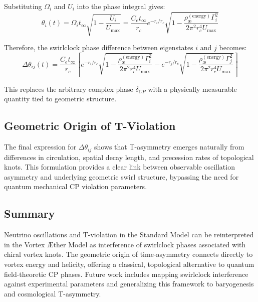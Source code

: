 Substituting \( \Omega_i \) and \( U_i \) into the phase integral gives:
\begin{equation}
\theta_i(t) = \Omega_i t_\infty \sqrt{1 - \frac{U_i}{U_\text{max}}} = \frac{C_e t_\infty}{r_c} e^{-r_i / r_c} \sqrt{1 - \frac{\rho_\text{\ae}^{(\text{energy})} \Gamma_i^2}{2 \pi^2 r_c^4 U_\text{max}}}
\end{equation}

Therefore, the swirlclock phase difference between eigenstates \( i \) and \( j \) becomes:
\begin{equation}
\Delta \theta_{ij}(t) = \frac{C_e t_\infty}{r_c} \left[
e^{-r_i/r_c} \sqrt{1 - \frac{\rho_\text{\ae}^{(\text{energy})} \Gamma_i^2}{2 \pi^2 r_c^4 U_\text{max}}} -
e^{-r_j/r_c} \sqrt{1 - \frac{\rho_\text{\ae}^{(\text{energy})} \Gamma_j^2}{2 \pi^2 r_c^4 U_\text{max}}}
\right]
\end{equation}

This replaces the arbitrary complex phase \( \delta_{CP} \) with a physically measurable quantity tied to geometric structure.

\subsection{Geometric Origin of T-Violation}

The final expression for \( \Delta \theta_{ij} \) shows that T-asymmetry emerges naturally from differences in circulation, spatial decay length, and precession rates of topological knots. This formulation provides a clear link between observable oscillation asymmetry and underlying geometric swirl structure, bypassing the need for quantum mechanical CP violation parameters.

\subsection{Summary}

Neutrino oscillations and T-violation in the Standard Model can be reinterpreted in the Vortex \AE ther Model as interference of swirlclock phases associated with chiral vortex knots. The geometric origin of time-asymmetry connects directly to vortex energy and helicity, offering a classical, topological alternative to quantum field-theoretic CP phases. Future work includes mapping swirlclock interference against experimental parameters and generalizing this framework to baryogenesis and cosmological T-asymmetry.
